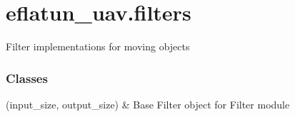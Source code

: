 \documentclass[letterpaper,10pt,english]{sphinxmanual}
\begin{document}
\sphinxstepscope


\section{eflatun\_uav.filters}
\label{\detokenize{generated/eflatun_uav.filters:module-eflatun_uav.filters}}\label{\detokenize{generated/eflatun_uav.filters:eflatun-uav-filters}}\label{\detokenize{generated/eflatun_uav.filters::doc}}
\sphinxAtStartPar
Filter implementations for moving objects
\subsubsection*{Classes}


\begin{savenotes}\sphinxattablestart
\sphinxthistablewithglobalstyle
\sphinxthistablewithnovlinesstyle
\centering
\begin{tabulary}{\linewidth}[t]{}
\sphinxtoprule
\sphinxtableatstartofbodyhook
\sphinxAtStartPar
{\hyperref[\detokenize{generated/eflatun_uav.filters:eflatun_uav.filters.BaseFilter}]{}}(input\_size, output\_size)
&
\sphinxAtStartPar
Base Filter object for Filter module
\\
\sphinxbottomrule
\end{tabulary}
\sphinxtableafterendhook\par
\sphinxattableend\end{savenotes}
\end{document}
